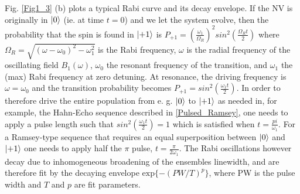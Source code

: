 Fig. \ref{Fig1_3} (b) plots a typical Rabi curve and its decay envelope. If the NV is originally in $\ket{0}$ (ie. at time $t = 0$) and we let the system evolve, then the probability that the spin is found in $\ket{+1}$ is $P_{+1} = \left(\frac{\omega_1}{\Omega_R}\right)^2 sin^2\left(\frac{\Omega_R t}{2}\right)$ where $\Omega_R = \sqrt{(\omega-\omega_0)^2-\omega_1^2}$ is the Rabi frequency, $\omega$ is the radial frequency of the oscillating field $B_1(\omega)$, $\omega_0$ the resonant frequency of the transition, and $\omega_1$ the (max) Rabi frequency at zero detuning. At resonance, the driving frequency is $\omega = \omega_0$ and the transition probability becomes $P_{+1} = sin^2\left(\frac{\omega_1 t}{2}\right)$. In order to therefore drive the entire population from e. g. $\ket{0}$ to $\ket{+1}$ as needed in, for example, the Hahn-Echo sequence described in \ref{Pulsed_Ramsey}, one needs to apply a pulse length such that $sin^2 \left(\frac{\omega_1 t}{2}\right) = 1$ which is satisfied when $t = \frac{pi}{\omega_1}$. For a Ramsey-type sequence that requires an equal superposition between $\ket{0}$ and $\ket{+1}$ one needs to apply half the $\pi$ pulse, $t = \frac{\pi}{2\omega_1}$. The Rabi oscillations however decay due to inhomogeneous broadening of the ensembles linewidth, and are therefore fit by the decaying envelope $\text{exp}\{-\left(PW/T\right)^p\}$, where PW is the pulse width and $T$ and $p$ are fit parameters.


